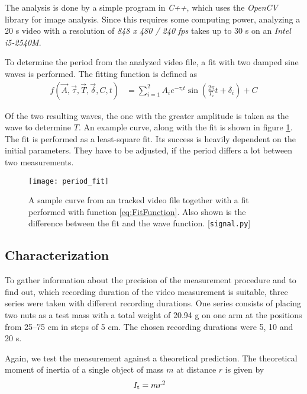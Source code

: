 \documentclass[journal]{IEEEtran}
\begin{document}
The analysis is done by a simple program in \emph{C++}, which uses the \emph{OpenCV} library for image analysis.
Since this requires some computing power, analyzing a 20 s video with a resolution of \emph{848 x 480 / 240 fps} takes up to 30 s on an \emph{Intel i5-2540M}.

To determine the period from the analyzed video file, a fit with two damped sine waves is performed. The fitting function is defined as
\begin{align}
	f(\vec{A}, \vec{\tau}, \vec{T}, \vec{\delta}, C, t) & = \sum_{i=1}^2 A_i e^{-\tau_i t} \sin \left( \frac{2\pi}{T_i} t + \delta_i \right) + C
	\label{eq:FitFunction}
\end{align}

Of the two resulting waves, the one with the greater amplitude is taken as the wave to determine $T$. An example curve, along with the fit is shown in figure \ref{fig:PeriodFit}.
The fit is performed as a least-square fit. Its success is heavily dependent on the initial parameters.
They have to be adjusted, if the period differs a lot between two measurements.

\begin{figure}
	\centering
	\texttt{[image: period\_fit]}
	\caption{A sample curve from an tracked video file together with a fit performed with function \eqref{eq:FitFunction}. Also shown is the difference between the fit and the wave function. [\texttt{signal.py}]}
	\label{fig:PeriodFit}
\end{figure}

\subsection{Characterization}

To gather information about the precision of the measurement procedure and to find out, which recording duration of the video measurement is suitable, three series were taken with different recording durations.
One series consists of placing two nuts as a test mass with a total weight of 20.94 g on one arm at the positions from 25--75 cm in steps of 5 cm.
The chosen recording durations were 5, 10 and 20 s.

Again, we test the measurement against a theoretical prediction.
The theoretical moment of inertia of a single object of mass $m$ at distance $r$ is given by
\begin{align} 
	I_{\textup{t}} & = m r^2
	\label{eq:It}
\end{align}
\end{document}

